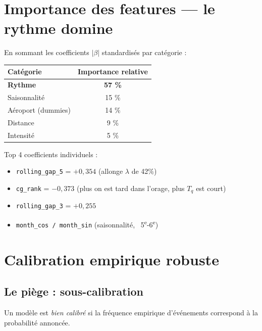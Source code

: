 \documentclass[11pt,a4paper]{article}
\begin{document}
\section{Importance des features — le rythme domine}

En sommant les coefficients $|\beta|$ standardisés par catégorie :

\begin{table}[H]
\centering
\begin{tabular}{lc}
\toprule
\textbf{Catégorie} & \textbf{Importance relative} \\
\midrule
\textbf{Rythme}     & \textbf{57 \%} \\
Saisonnalité        & 15 \% \\
Aéroport (dummies)  & 14 \% \\
Distance            &  9 \% \\
Intensité           &  5 \% \\
\bottomrule
\end{tabular}
\end{table}

Top 4 coefficients individuels :
\begin{itemize}[topsep=2pt]
    \item \texttt{rolling\_gap\_5} = $+0{,}354$ (allonge $\lambda$ de 42\%)
    \item \texttt{cg\_rank} = $-0{,}373$ (plus on est tard dans l'orage, plus $T_q$ est court)
    \item \texttt{rolling\_gap\_3} = $+0{,}255$
    \item \texttt{month\_cos / month\_sin} (saisonnalité, ~5\textsuperscript{e}-6\textsuperscript{e})
\end{itemize}

\section{Calibration empirique robuste}

\subsection{Le piège : sous-calibration}

\begin{tcolorbox}[colback=red!5,colframe=red!50!black,title=\textbf{Calibration des quantiles}]
Un modèle est \emph{bien calibré} si la fréquence empirique d'événements correspond à la
probabilité annoncée.
\end{tcolorbox}
\end{document}
